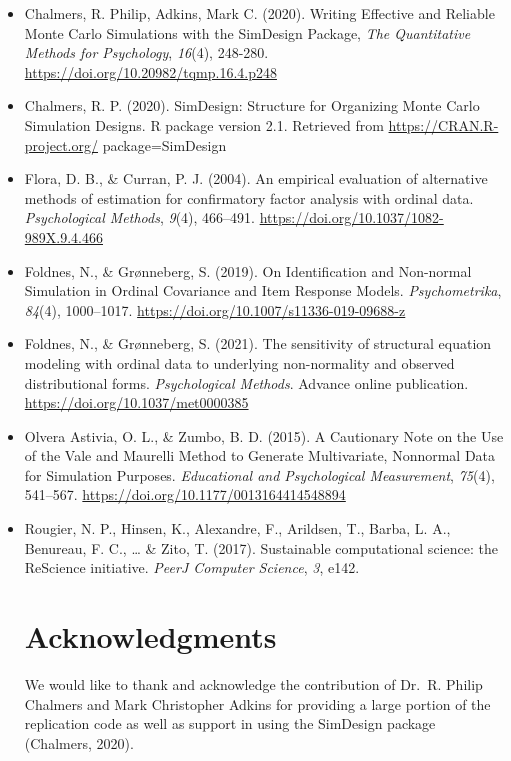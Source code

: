 \documentclass[10,a4paperpaper,]{article}
\begin{document}
\begin{itemize}
\item
  Chalmers, R. Philip, Adkins, Mark C. (2020). Writing Effective and
  Reliable Monte Carlo Simulations with the SimDesign Package, \emph{The
  Quantitative Methods for Psychology}, \emph{16}(4), 248-280.
  \url{https://doi.org/10.20982/tqmp.16.4.p248}
\item
  Chalmers, R. P. (2020). SimDesign: Structure for Organizing Monte
  Carlo Simulation Designs. R package version 2.1. Retrieved from
  \url{https://CRAN.R-project.org/} package=SimDesign
\item
  Flora, D. B., \& Curran, P. J. (2004). An empirical evaluation of
  alternative methods of estimation for confirmatory factor analysis
  with ordinal data. \emph{Psychological Methods}, \emph{9}(4),
  466--491. \url{https://doi.org/10.1037/1082-989X.9.4.466}
\item
  Foldnes, N., \& Grønneberg, S. (2019). On Identification and
  Non-normal Simulation in Ordinal Covariance and Item Response Models.
  \emph{Psychometrika}, \emph{84}(4), 1000--1017.
  \url{https://doi.org/10.1007/s11336-019-09688-z}
\item
  Foldnes, N., \& Grønneberg, S. (2021). The sensitivity of structural
  equation modeling with ordinal data to underlying non-normality and
  observed distributional forms. \emph{Psychological Methods}. Advance
  online publication. \url{https://doi.org/10.1037/met0000385}
\item
  Olvera Astivia, O. L., \& Zumbo, B. D. (2015). A Cautionary Note on
  the Use of the Vale and Maurelli Method to Generate Multivariate,
  Nonnormal Data for Simulation Purposes. \emph{Educational and
  Psychological Measurement}, \emph{75}(4), 541--567.
  \url{https://doi.org/10.1177/0013164414548894}
\item
  Rougier, N. P., Hinsen, K., Alexandre, F., Arildsen, T., Barba, L. A.,
  Benureau, F. C., \ldots{} \& Zito, T. (2017). Sustainable
  computational science: the ReScience initiative. \emph{PeerJ Computer
  Science}, \emph{3}, e142.

  \section*{Acknowledgments}

  We would like to thank and acknowledge the contribution of Dr.~R.
  Philip Chalmers and Mark Christopher Adkins for providing a large
  portion of the replication code as well as support in using the
  SimDesign package (Chalmers, 2020).


\end{itemize}
\end{document}
